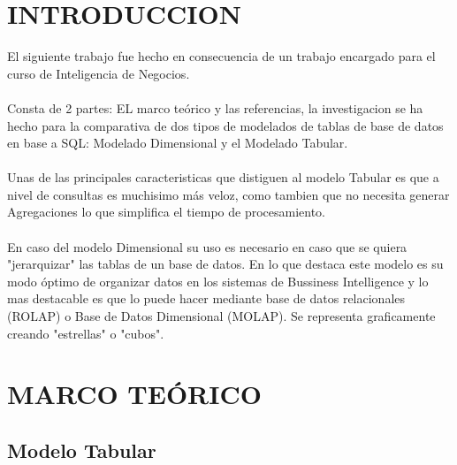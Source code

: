 \documentclass[11pt,a4paper]{article}
\begin{document}
	 \section{INTRODUCCION}
	 
	 El siguiente trabajo fue hecho en consecuencia de un trabajo encargado para el curso de Inteligencia de Negocios.\\
	 \\
	 Consta de 2 partes: EL marco teórico y las referencias, la investigacion se ha hecho para la comparativa de dos tipos de modelados de tablas de base de datos en base a SQL: Modelado Dimensional y el Modelado Tabular.\\
	 \\
	 Unas de las principales caracteristicas que distiguen al modelo Tabular es que a nivel de consultas es muchisimo más veloz, como tambien que no necesita generar Agregaciones lo que simplifica el tiempo de procesamiento.\\
	 \\
	 En caso del modelo Dimensional su uso es necesario en caso que se quiera "jerarquizar" las tablas de un base de datos. En lo que destaca este modelo es su modo óptimo de organizar datos en los sistemas de Bussiness Intelligence  y lo mas destacable es que lo puede hacer mediante base de datos relacionales (ROLAP) o Base de Datos Dimensional (MOLAP). Se representa graficamente creando "estrellas" o "cubos".
	 	 
	 \section{MARCO TEÓRICO}
	 
	 	\subsection{Modelo Tabular}
	 	
\end{document}
